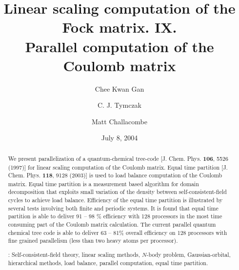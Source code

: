 \commentoutA{\documentclass[prl,aps,twocolumn,twocolumngrid,superbib]{revtex4}}
\begin{document}
\title[Short Title]{
Linear scaling computation of the Fock matrix. IX. \\
Parallel computation of the Coulomb matrix\footnotemark[1]}

\author{Chee Kwan Gan\footnotemark[2]}
\author{C. J. Tymczak}
\author{Matt Challacombe}


\date{July 8, 2004}

\begin{abstract}
We present parallelization of a quantum-chemical tree-code
[J. Chem. Phys. {\bf 106}, 5526 (1997)] for linear scaling computation
of the Coulomb matrix.  Equal time partition [J. Chem. Phys. {\bf
118}, 9128 (2003)] is used to load balance computation of the Coulomb
matrix. Equal time partition is a measurement based algorithm for
domain decomposition that exploits small variation of the density
between self-consistent-field cycles to achieve load balance.
Efficiency of the equal time partition is illustrated by several tests
involving both finite and periodic systems.  It is found that equal time
partition is able to deliver 91 -- 98 \% efficiency with 128
processors in the most time consuming part of the
Coulomb matrix calculation.  The current parallel quantum chemical
tree code is able to deliver 63 -- 81\% overall efficiency on 128
processors with fine grained parallelism (less than two heavy atoms
per processor).


\smallskip
{}:
Self-consistent-field theory, linear scaling methods, $N$-body problem,
Gaussian-orbital, hierarchical methods, load balance, parallel computation,
equal time partition.

\end{abstract}
\maketitle
\end{document}
